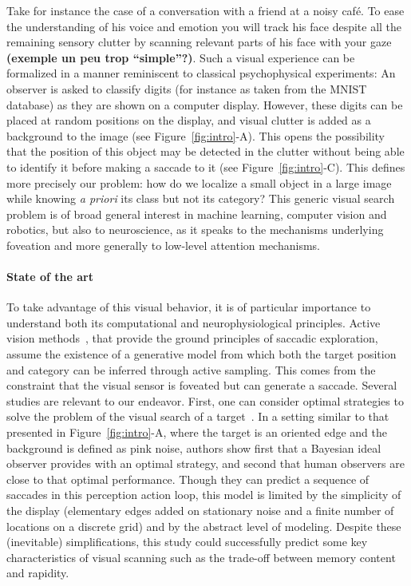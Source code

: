 Take for instance the case of a conversation with a friend at a noisy café. To ease the understanding of his voice and emotion you will track his face despite all the remaining sensory clutter by scanning relevant parts of his face with your gaze {\bf (exemple un peu trop ``simple''?)}. 
 Such a visual experience can be formalized in a manner reminiscent to classical psychophysical experiments: An observer is asked to classify digits (for instance as taken from the MNIST database) as they are shown on a computer display. However, these digits can be placed at random positions on the display, and visual clutter is added as a background to the image (see Figure~\ref{fig:intro}-A). This opens the possibility that the position of this object may be detected in the clutter without being able to identify it before making a saccade to it (see Figure~\ref{fig:intro}-C). This defines more precisely our problem: how do we localize a small object in a large image while knowing \emph{a priori} its class but not its category? This generic visual search problem is of broad general interest in machine learning, computer vision and robotics, but also to neuroscience, as it speaks to the mechanisms underlying foveation and more generally to low-level attention mechanisms.





\paragraph{State of the art}


To take advantage of this visual behavior, it is of particular importance to understand both its computational and neurophysiological principles.
Active vision methods~\citep{Najemnik05,Butko2010infomax,Friston12}, that provide the ground principles of saccadic exploration, assume the existence of a generative model from which both the target position and category can be inferred through active sampling. This comes from the constraint that the visual sensor is foveated but can generate a saccade. 
Several studies are relevant to our endeavor. First, one can consider optimal strategies to solve the problem of the visual search of a target~\citep{Najemnik05}. In a setting similar to that presented in Figure~\ref{fig:intro}-A, where the target is an oriented edge and the background is defined as pink noise, authors show first that a Bayesian ideal observer provides with an optimal strategy, and second that human observers are close to that optimal performance. Though they can predict a sequence of saccades in this perception action loop, this model is limited by the simplicity of the display (elementary edges added on stationary noise and a finite number of locations on a discrete grid) and by the abstract level of modeling. Despite these (inevitable) simplifications, this study could successfully predict some key characteristics of visual scanning such as the trade-off between memory content and rapidity.


